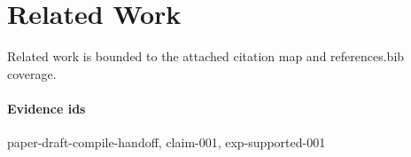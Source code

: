 \section{Related Work}
Related work is bounded to the attached citation map and references.bib coverage.

\paragraph{Evidence ids} paper-draft-compile-handoff, claim-001, exp-supported-001
